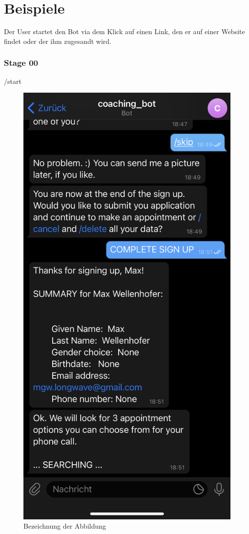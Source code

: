 \chapter{Beispiele}

Der User startet den Bot via dem Klick auf einen Link, den er auf einer Website findet oder der ihm zugesandt wird.

\subsection{Stage 00}
/start
\begin{figure} %
	\centering
	\includegraphics{images/coaching_bot_dummy_screenshot.jpeg}
	\caption{Bezeichnung der Abbildung}
	\label{a1}
\end{figure}



